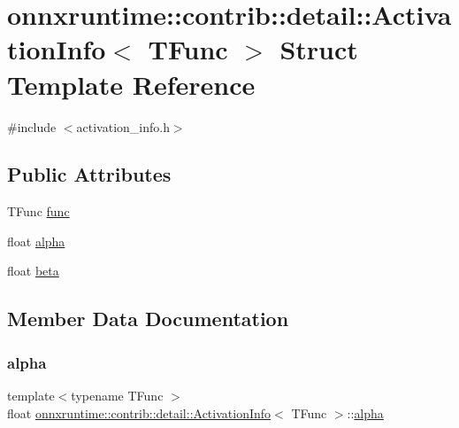 \hypertarget{structonnxruntime_1_1contrib_1_1detail_1_1ActivationInfo}{}\section{onnxruntime\+:\+:contrib\+:\+:detail\+:\+:Activation\+Info$<$ T\+Func $>$ Struct Template Reference}
\label{structonnxruntime_1_1contrib_1_1detail_1_1ActivationInfo}


{\ttfamily \#include $<$activation\+\_\+info.\+h$>$}

\subsection*{Public Attributes}
\begin{DoxyCompactItemize}
\item 
T\+Func \mbox{\hyperlink{structonnxruntime_1_1contrib_1_1detail_1_1ActivationInfo_aba5100763dcc95a3bfb9708fb169de40}{func}}
\item 
float \mbox{\hyperlink{structonnxruntime_1_1contrib_1_1detail_1_1ActivationInfo_ae32bb73acff3d496ac047d36dc65dd19}{alpha}}
\item 
float \mbox{\hyperlink{structonnxruntime_1_1contrib_1_1detail_1_1ActivationInfo_a2a26b84c28ddf7bb4dee73320f4187a1}{beta}}
\end{DoxyCompactItemize}


\subsection{Member Data Documentation}
\mbox{\label{structonnxruntime_1_1contrib_1_1detail_1_1ActivationInfo_ae32bb73acff3d496ac047d36dc65dd19}} 
\subsubsection{\texorpdfstring{alpha}{alpha}}
{\footnotesize\ttfamily template$<$typename T\+Func $>$ \\
float \mbox{\hyperlink{structonnxruntime_1_1contrib_1_1detail_1_1ActivationInfo}{onnxruntime\+::contrib\+::detail\+::\+Activation\+Info}}$<$ T\+Func $>$\+::\mbox{\hyperlink{mlasi_8h_a1763355f32e1812e5cb3a0080e7cca12}{alpha}}}

